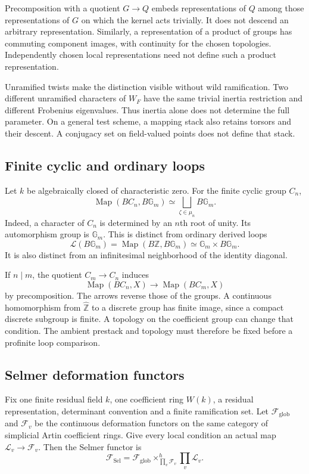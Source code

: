 Precomposition with a quotient \(G\to Q\) embeds representations
of \(Q\) among those representations of \(G\) on which the
kernel acts trivially. It does not descend an arbitrary
representation. Similarly, a representation of a product of
groups has commuting component images, with continuity for
the chosen topologies. Independently chosen local representations
need not define such a product representation.

Unramified twists make the distinction visible without wild
ramification. Two different unramified characters of \(W_F\)
have the same trivial inertia restriction and different
Frobenius eigenvalues. Thus inertia alone does not determine
the full parameter. On a general test scheme, a mapping stack
also retains torsors and their descent. A conjugacy set on
field-valued points does not define that stack.

\subsection{Finite cyclic and ordinary loops}

Let \(k\) be algebraically closed of characteristic zero.
For the finite cyclic group \(C_n\),
\[
 \operatorname{Map}(BC_n,B\mathbb G_m)
 \simeq\bigsqcup_{\zeta\in\mu_n}B\mathbb G_m.
\]
Indeed, a character of \(C_n\) is determined by an \(n\)th root
of unity. Its automorphism group is \(\mathbb G_m\).
This is distinct from ordinary derived loops
\[
 \mathcal L(B\mathbb G_m)
   =\operatorname{Map}(B\mathbb Z,B\mathbb G_m)
   \simeq\mathbb G_m\times B\mathbb G_m.
\]
It is also distinct from an infinitesimal neighborhood of the
identity diagonal.

If \(n\mid m\), the quotient \(C_m\to C_n\) induces
\[
 \operatorname{Map}(BC_n,X)
       \longrightarrow\operatorname{Map}(BC_m,X)
\]
by precomposition. The arrows reverse those of the groups.
A continuous homomorphism from \(\widehat{\mathbb Z}\) to a
discrete group has finite image, since a compact discrete
subgroup is finite. A topology on the coefficient group can
change that condition. The ambient prestack and topology
must therefore be fixed before a profinite loop comparison.

\subsection{Selmer deformation functors}

Fix one finite residual field \(k\), one coefficient ring \(W(k)\),
a residual representation, determinant convention and a finite
ramification set. Let \(\mathcal F_{\mathrm{glob}}\) and
\(\mathcal F_v\) be the continuous deformation functors on the
same category of simplicial Artin coefficient rings.
Give every local condition an actual map
\(\mathcal L_v\to\mathcal F_v\). Then the Selmer functor is
\[
 \mathcal F_{\mathrm{Sel}}
 =\mathcal F_{\mathrm{glob}}
       \times^h_{\prod_v\mathcal F_v}\prod_v\mathcal L_v.
\]

